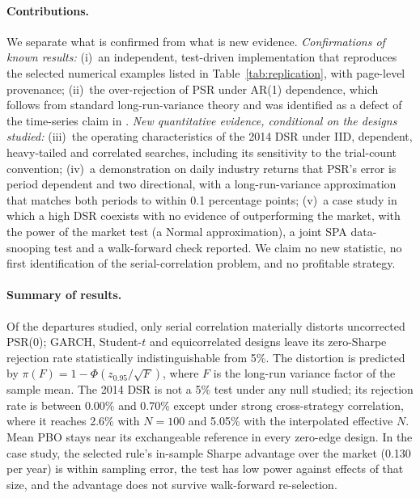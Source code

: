 \documentclass[11pt,a4paper]{article}
\theoremstyle{remark}
\begin{document}
\paragraph{Contributions.} We separate what is confirmed from what is new evidence. \emph{Confirmations of known results:} (i)~an independent, test-driven implementation that reproduces the selected numerical examples listed in Table~\ref{tab:replication}, with page-level provenance; (ii)~the over-rejection of PSR under AR(1) dependence, which follows from standard long-run-variance theory \citep{lo2002} and was identified as a defect of the time-series claim in \citet[Remark~3.1]{ledoit2008}. \emph{New quantitative evidence, conditional on the designs studied:} (iii)~the operating characteristics of the 2014 DSR under IID, dependent, heavy-tailed and correlated searches, including its sensitivity to the trial-count convention; (iv)~a demonstration on daily industry returns that PSR's error is period dependent and two directional, with a long-run-variance approximation that matches both periods to within 0.1 percentage points; (v)~a case study in which a high DSR coexists with no evidence of outperforming the market, with the power of the market test (a Normal approximation), a joint SPA data-snooping test and a walk-forward check reported. We claim no new statistic, no first identification of the serial-correlation problem, and no profitable strategy.

\paragraph{Summary of results.} Of the departures studied, only serial correlation materially distorts uncorrected PSR(0); GARCH, Student-$t$ and equicorrelated designs leave its zero-Sharpe rejection rate statistically indistinguishable from 5\%. The distortion is predicted by $\pi(F)=1-\Phi(z_{0.95}/\sqrt{F})$, where $F$ is the long-run variance factor of the sample mean. The 2014 DSR is not a 5\% test under any null studied; its rejection rate is between 0.00\% and 0.70\% except under strong cross-strategy correlation, where it reaches 2.6\% with $N=100$ and 5.05\% with the interpolated effective $N$. Mean PBO stays near its exchangeable reference in every zero-edge design. In the case study, the selected rule's in-sample Sharpe advantage over the market (0.130 per year) is within sampling error, the test has low power against effects of that size, and the advantage does not survive walk-forward re-selection.
\end{document}
